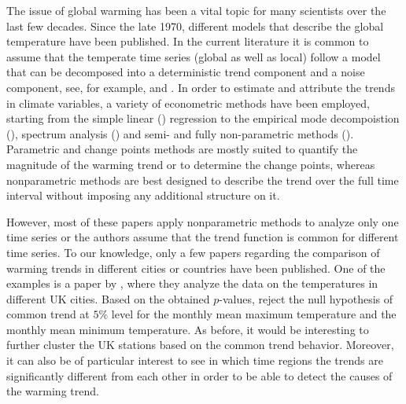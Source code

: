 \documentclass[a4paper,12pt]{article}
\begin{document}
\begin{example}
The issue of global warming has been a vital topic for many scientists over the last few decades. Since the late 1970, different models that describe the global temperature have been published. In the current literature it is common to assume that the temperate time series (global as well as local) follow a model that can be decomposed into a deterministic trend component and a noise component, see, for example, \cite{Ghil1991} and \cite{Mudelsee2018}. In order to estimate and attribute the trends in climate variables, a variety of econometric methods have been employed, starting from the simple linear (\cite{Yue2013}) regression to the empirical mode decompoistion (\cite{Wu2011}), spectrum analysis (\cite{Ghil1991}) and semi- and fully non-parametric methods (\cite{Gao2006}). Parametric and change points methods are mostly suited to quantify the magnitude of the warming trend or to determine the change points, whereas nonparametric methods are best designed to describe the trend over the full time interval without imposing any additional structure on it.

However, most of these papers apply nonparametric methods to analyze only one time series or the authors assume that the trend function is common for different time series. To our knowledge, only a few papers regarding the comparison of warming trends in different cities or countries have been published. One of the examples is a paper by \cite{Zhang2012}, where they analyze the data on the temperatures in different UK cities. Based on the obtained $p$-values, \cite{Zhang2012} reject the null hypothesis of common trend at $5\%$ level for the monthly mean maximum temperature and the monthly mean minimum temperature. As before, it would be interesting to further cluster the UK stations based on the common trend behavior. Moreover, it can also be of particular interest to see in which time regions the trends are significantly different from each other in order to be able to detect the causes of the warming trend.



\end{example}
\end{document}

